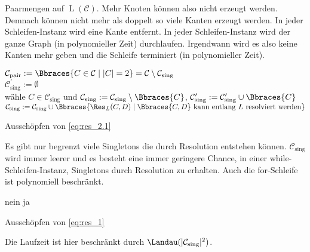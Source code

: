 \begin{solution}
Paarmengen auf $\operatorname L(\mathcal C)$.
Mehr Knoten können also nicht erzeugt werden.
Demnach können nicht mehr als doppelt so viele Kanten erzeugt werden.
In jeder Schleifen-Instanz wird eine Kante entfernt.
In jeder Schleifen-Instanz wird der ganze Graph (in polynomieller Zeit) durchlaufen.
Irgendwann wird es also keine Kanten mehr geben und die Schleife terminiert (in polynomieller Zeit).

\begin{algorithm}[H]
    $\mathcal C_\text{pair} := \Bbraces{C \in \mathcal C \mid |C| = 2} = \mathcal C \setminus \mathcal C_\text{sing}$ \\
    $\mathcal C_\text{sing}^\prime := \emptyset$ \\
    {
        wähle $C \in \mathcal C_\text{sing}$ und $\mathcal C_\text{sing} := \mathcal C_\text{sing} \setminus \Bbraces{C}$, $\mathcal C_\text{sing}^\prime := \mathcal C_\text{sing}^\prime \cup \Bbraces{C}$ \\
        {
            $\mathcal C_\text{sing} := \mathcal C_\text{sing} \cup \Bbraces{\Res_L(C, D) \mid \Bbraces{C, D} ~\text{kann entlang}~ L ~\text{resolviert werden}}$ \\
        }
    }
    \caption
    {
        Ausschöpfen von \eqref{eq:res_2.1}
    }
\end{algorithm}

Es gibt nur begrenzt viele Singletons die durch Resolution entstehen können.
$\mathcal C_\text{sing}$ wird immer leerer und es besteht eine immer geringere Chance, in einer while-Schleifen-Instanz, Singletons durch Resolution zu erhalten.
Auch die for-Schleife ist polynomiell beschränkt.

\begin{algorithm}[H]
    {
        {
            {
                \KwRet nein
            }
        }
    }
    \KwRet ja
    \caption
    {
        Ausschöpfen von \eqref{eq:res_1}
    }
\end{algorithm}

Die Laufzeit ist hier beschränkt durch $\Landau(|\mathcal C_\text{sing}|^2)$.

\end{solution}

